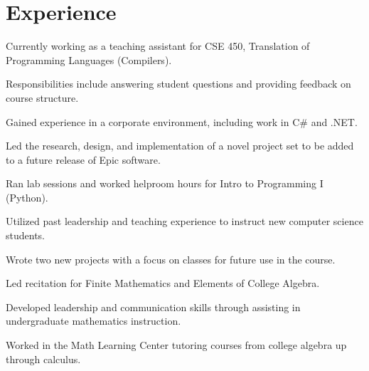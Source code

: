 \documentclass[]{deedy-resume-openfont}
\begin{document}
\hfill
\begin{minipage}[t]{0.66\textwidth} 


\section{Experience}

\vspace{\topsep} %
\begin{tightemize}
\item Currently working as a teaching assistant for CSE 450, Translation of Programming Languages (Compilers).
\item Responsibilities include answering student questions and providing feedback on course structure.
\end{tightemize}
\sectionsep

\begin{tightemize}
\item Gained experience in a corporate environment, including work in C\# and .NET.
\item Led the research, design, and implementation of a novel project set to be added to a future release of Epic software.
\end{tightemize}
\sectionsep

\begin{tightemize}
\item Ran lab sessions and worked helproom hours for Intro to Programming I (Python).
\item Utilized past leadership and teaching experience to instruct new computer science students.
\item Wrote two new projects with a focus on classes for future use in the course.
\end{tightemize}
\sectionsep

\begin{tightemize}
\item Led recitation for Finite Mathematics and Elements of College Algebra.
\item Developed leadership and communication skills through assisting in undergraduate mathematics instruction.
\item Worked in the Math Learning Center tutoring courses from college algebra up through calculus.
\end{tightemize}
\sectionsep


\end{minipage}
\end{document}
